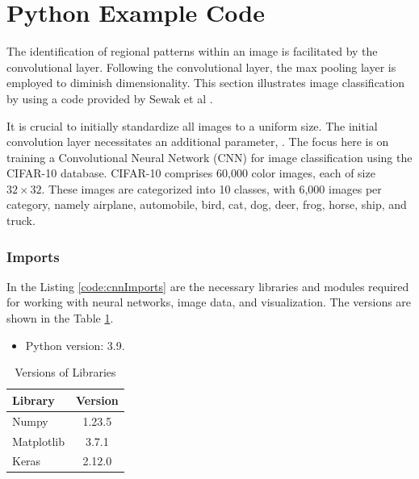 \section{Python Example Code}
\label{section:DataMiningExampleCode}

The identification of regional patterns within an image is facilitated by the convolutional layer. Following the convolutional layer, the max pooling layer is employed to diminish dimensionality. This section illustrates image classification by using a code provided by Sewak et al \cite{Sewak:2018}.

It is crucial to initially standardize all images to a uniform size. The initial convolution layer necessitates an additional parameter, . The focus here is on training a Convolutional Neural Network (CNN) for image classification using the CIFAR-10 database. CIFAR-10 comprises 60,000 color images, each of size $32 \times 32$. These images are categorized into 10 classes, with 6,000 images per category, namely airplane, automobile, bird, cat, dog, deer, frog, horse, ship, and truck.

\subsubsection{Imports}

In the Listing \ref{code:cnnImports} are the necessary libraries and modules required for working with neural networks, image data, and visualization. The versions are shown in the Table \ref{tab:cnnlibraryVersions}.

\begin{itemize}
	\item Python version: 3.9.
\end{itemize}

\begin{table}[htbp]
	\centering
	\caption{Versions of Libraries}
	\label{tab:cnnlibraryVersions}
	\begin{tabular}{|l|c|}
		\hline
		\textbf{Library} & \textbf{Version} \\
		\hline
		Numpy & 1.23.5 \\
		Matplotlib & 3.7.1 \\
		Keras & 2.12.0 \\
		\hline
	\end{tabular}
\end{table}

\begin{code}[h!]
	    
	
	\caption{Importing necessary libraries and modules.}
	\label{code:cnnImports}
\end{code}

